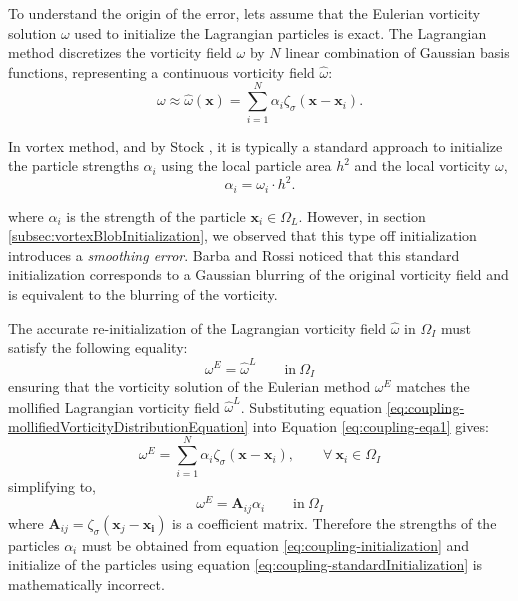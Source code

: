 	To understand the origin of the error, lets assume that the Eulerian vorticity solution $\omega$ used to initialize the Lagrangian particles is exact. The Lagrangian method discretizes the vorticity field $\omega$ by $N$ linear combination of Gaussian basis functions, representing a continuous vorticity field $\hat{\omega}$:
		\begin{equation}
		\omega \approx \hat{\omega}(\mathbf{x}) = \sum_{i=1}^{N} \alpha_i \zeta_{\sigma}(\mathbf{x} - \mathbf{x}_i).
		\label{eq:coupling-mollifiedVorticityDistributionEquation}
		\end{equation}
	
	In vortex method, and by Stock \cite{Stock2010a}, it is typically a standard approach to initialize the particle strengths $\alpha_i$ using the local particle area $h^2$ and the local vorticity $\omega$,
		\begin{equation}
		\alpha_i = \omega_i\cdot{h^2}.
		\label{eq:coupling-standardInitialization}
		\end{equation}
	
	where $\alpha_i$ is the strength of the particle $\mathbf{x}_i\in\Omega_L$. However, in section \ref{subsec:vortexBlobInitialization}, we observed that this type off initialization introduces a \textit{smoothing error}. Barba and Rossi \cite{Barba2010a} noticed that this standard initialization corresponds to a Gaussian blurring of the original vorticity field and is equivalent to the blurring of the vorticity. 
	
	The accurate re-initialization of the Lagrangian vorticity field $\hat{\omega}$ in $\Omega_I$ must satisfy the following equality:
		\begin{equation}
		\omega^E = \hat{\omega}^L \qquad \mathrm{in}\ \Omega_I
		\label{eq:coupling-eqa1}
		\end{equation} 
	ensuring that the vorticity solution of the Eulerian method $\omega^E$ matches the mollified Lagrangian vorticity field $\hat{\omega}^L$. Substituting equation \ref{eq:coupling-mollifiedVorticityDistributionEquation} into Equation \ref{eq:coupling-eqa1} gives:
		\begin{equation}
		\omega^E = \sum_{i=1}^{N} \alpha_i \zeta_{\sigma}(\mathbf{x} - \mathbf{x}_i), \qquad \forall\ \mathbf{x}_i \in \Omega_I
		\end{equation}
	simplifying to,
		\begin{equation}
		\omega^E = \mathbf{A}_{ij}\alpha_i \qquad \mathrm{in}\ \Omega_I
		\label{eq:coupling-initialization}
		\end{equation}
	where $\mathbf{A}_{ij}=\zeta_{\sigma}(\mathbf{x}_j-\mathbf{x_i})$ is a coefficient matrix. Therefore the strengths of the particles $\alpha_i$ must be obtained from equation \ref{eq:coupling-initialization} and initialize of the particles using equation \ref{eq:coupling-standardInitialization} is mathematically incorrect. 
	
